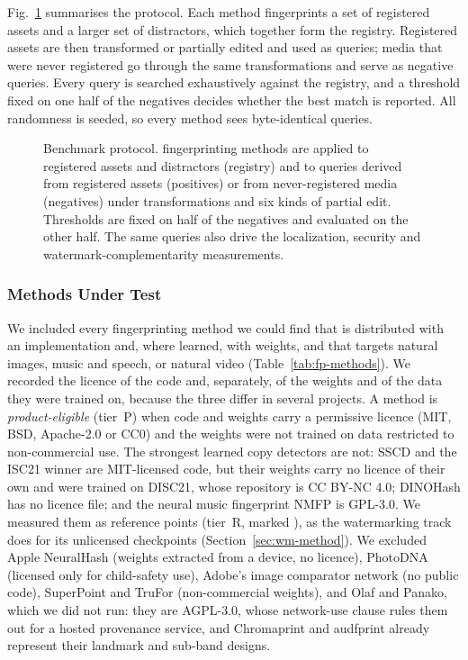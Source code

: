 Fig.~\ref{fig:fp-protocol} summarises the protocol. Each method fingerprints a set of registered assets and a larger set of distractors, which together form the registry. Registered assets are then transformed or partially edited and used as queries; media that were never registered go through the same transformations and serve as negative queries. Every query is searched exhaustively against the registry, and a threshold fixed on one half of the negatives decides whether the best match is reported. All randomness is seeded, so every method sees byte-identical queries.

\begin{figure}[!t]
\centering

\caption{Benchmark protocol.  fingerprinting methods are applied to registered assets and distractors (registry) and to queries derived from registered assets (positives) or from never-registered media (negatives) under  transformations and six kinds of partial edit. Thresholds are fixed on half of the negatives and evaluated on the other half. The same queries also drive the localization, security and watermark-complementarity measurements.}
\label{fig:fp-protocol}
\end{figure}

\subsubsection{Methods Under Test}
We included every fingerprinting method we could find that is distributed with an implementation and, where learned, with weights, and that targets natural images, music and speech, or natural video (Table~\ref{tab:fp-methods}). We recorded the licence of the code and, separately, of the weights and of the data they were trained on, because the three differ in several projects. A method is \emph{product-eligible} (tier~P) when code and weights carry a permissive licence (MIT, BSD, Apache-2.0 or CC0) and the weights were not trained on data restricted to non-commercial use. The strongest learned copy detectors are not: SSCD and the ISC21 winner are MIT-licensed code, but their weights carry no licence of their own and were trained on DISC21, whose repository is CC BY-NC 4.0; DINOHash has no licence file; and the neural music fingerprint NMFP is GPL-3.0. We measured them as reference points (tier~R, marked ), as the watermarking track does for its unlicensed checkpoints (Section~\ref{sec:wm-method}). We excluded Apple NeuralHash (weights extracted from a device, no licence), PhotoDNA (licensed only for child-safety use), Adobe's image comparator network (no public code), SuperPoint and TruFor (non-commercial weights), and Olaf and Panako, which we did not run: they are AGPL-3.0, whose network-use clause rules them out for a hosted provenance service, and Chromaprint and audfprint already represent their landmark and sub-band designs.

